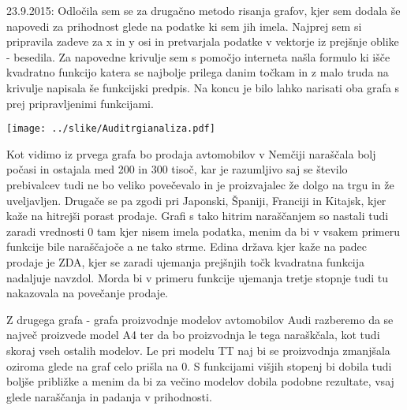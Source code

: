 \documentclass[11pt,a4paper]{article}
\begin{document}
23.9.2015: Odločila sem se za drugačno metodo risanja grafov, kjer sem dodala še napovedi za prihodnost glede na podatke ki sem jih imela. Najprej sem si pripravila zadeve za x in y osi in pretvarjala podatke v vektorje iz prejšnje oblike - besedila. Za napovedne krivulje sem s pomočjo interneta našla formulo ki išče kvadratno funkcijo katera se najbolje prilega danim točkam in z malo truda na krivulje napisala še funkcijski predpis. Na koncu je bilo lahko narisati oba grafa s prej pripravljenimi funkcijami.

\texttt{[image: ../slike/Auditrgianaliza.pdf]}

Kot vidimo iz prvega grafa bo prodaja avtomobilov v Nemčiji  naraščala bolj počasi in ostajala med 200 in 300 tisoč, kar je razumljivo saj se število prebivalcev tudi ne bo veliko povečevalo in je proizvajalec že dolgo na trgu in že uveljavljen. Drugače se pa zgodi pri Japonski, Španiji, Franciji in Kitajsk, kjer kaže na hitrejši porast prodaje. Grafi s tako hitrim naraščanjem so nastali tudi zaradi vrednosti 0 tam kjer nisem imela podatka, menim da bi v vsakem primeru funkcije bile naraščajoče a ne tako strme. Edina država kjer kaže na padec prodaje je ZDA, kjer se zaradi ujemanja prejšnjih točk kvadratna funkcija nadaljuje navzdol. Morda bi v primeru funkcije ujemanja tretje stopnje tudi tu nakazovala na povečanje prodaje.

Z drugega grafa - grafa proizvodnje modelov avtomobilov Audi razberemo da se največ proizvede model A4 ter da bo proizvodnja le tega naraškčala, kot tudi skoraj vseh ostalih modelov. Le pri modelu TT naj bi se proizvodnja zmanjšala oziroma glede na graf celo prišla na 0. S funkcijami višjih stopenj bi dobila tudi boljše približke a menim da bi za večino modelov dobila podobne rezultate, vsaj glede naraščanja in padanja v prihodnosti.
\end{document}
